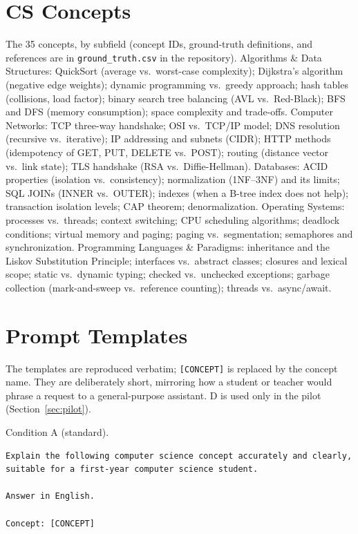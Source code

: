 \documentclass[journal,article,submit,pdftex,moreauthors]{Definitions/mdpi}
\begin{document}
\appendixstart
\appendix

\section[\appendixname~\thesection]{CS Concepts}
\label{appendix:concepts}

The 35 concepts, by subfield (concept IDs, ground-truth definitions, and references are in \texttt{ground\_truth.csv} in the repository). Algorithms \& Data Structures: QuickSort (average vs.\ worst-case complexity); Dijkstra's algorithm (negative edge weights); dynamic programming vs.\ greedy approach; hash tables (collisions, load factor); binary search tree balancing (AVL vs.\ Red-Black); BFS and DFS (memory consumption); space complexity and trade-offs. Computer Networks: TCP three-way handshake; OSI vs.\ TCP/IP model; DNS resolution (recursive vs.\ iterative); IP addressing and subnets (CIDR); HTTP methods (idempotency of GET, PUT, DELETE vs.\ POST); routing (distance vector vs.\ link state); TLS handshake (RSA vs.\ Diffie-Hellman). Databases: ACID properties (isolation vs.\ consistency); normalization (1NF--3NF) and its limits; SQL JOINs (INNER vs.\ OUTER); indexes (when a B-tree index does not help); transaction isolation levels; CAP theorem; denormalization. Operating Systems: processes vs.\ threads; context switching; CPU scheduling algorithms; deadlock conditions; virtual memory and paging; paging vs.\ segmentation; semaphores and synchronization. Programming Languages \& Paradigms: inheritance and the Liskov Substitution Principle; interfaces vs.\ abstract classes; closures and lexical scope; static vs.\ dynamic typing; checked vs.\ unchecked exceptions; garbage collection (mark-and-sweep vs.\ reference counting); threads vs.\ async/await.

\section[\appendixname~\thesection]{Prompt Templates}
\label{appendix:prompts}

The templates are reproduced verbatim; \texttt{[CONCEPT]} is replaced by the concept name. They are deliberately short, mirroring how a student or teacher would phrase a request to a general-purpose assistant. D is used only in the pilot (Section~\ref{sec:pilot}).

\noindent Condition A (standard).
\begin{verbatim}
Explain the following computer science concept accurately and clearly, 
suitable for a first-year computer science student.

Answer in English.

Concept: [CONCEPT]
\end{verbatim}
\end{document}
